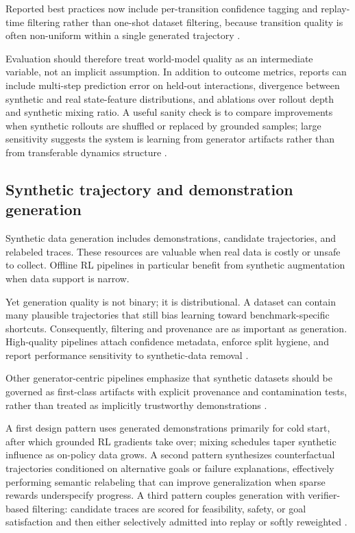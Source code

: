 ﻿\documentclass[conference]{IEEEtran}
\begin{document}
Reported best practices now include per-transition confidence tagging and replay-time filtering rather than one-shot dataset filtering, because transition quality is often non-uniform within a single generated trajectory \cite{arxiv_p_2602_00785,arxiv_p_2602_03022,arxiv_p_2602_12099}.

Evaluation should therefore treat world-model quality as an intermediate variable, not an implicit assumption. In addition to outcome metrics, reports can include multi-step prediction error on held-out interactions, divergence between synthetic and real state-feature distributions, and ablations over rollout depth and synthetic mixing ratio. A useful sanity check is to compare improvements when synthetic rollouts are shuffled or replaced by grounded samples; large sensitivity suggests the system is learning from generator artifacts rather than from transferable dynamics structure \cite{arxiv_p_2601_22149,arxiv_p_2602_02454,arxiv_p_2602_11075}.

\subsection{Synthetic trajectory and demonstration generation}
Synthetic data generation includes demonstrations, candidate trajectories, and relabeled traces. These resources are valuable when real data is costly or unsafe to collect. Offline RL pipelines in particular benefit from synthetic augmentation when data support is narrow.

Yet generation quality is not binary; it is distributional. A dataset can contain many plausible trajectories that still bias learning toward benchmark-specific shortcuts. Consequently, filtering and provenance are as important as generation. High-quality pipelines attach confidence metadata, enforce split hygiene, and report performance sensitivity to synthetic-data removal \cite{arxiv_p_2310_20587,arxiv_p_2505_18098,arxiv_p_2601_08107,arxiv_p_2602_14468}.

Other generator-centric pipelines emphasize that synthetic datasets should be governed as first-class artifacts with explicit provenance and contamination tests, rather than treated as implicitly trustworthy demonstrations \cite{arxiv_p_2601_03205}.

A first design pattern uses generated demonstrations primarily for cold start, after which grounded RL gradients take over; mixing schedules taper synthetic influence as on-policy data grows. A second pattern synthesizes counterfactual trajectories conditioned on alternative goals or failure explanations, effectively performing semantic relabeling that can improve generalization when sparse rewards underspecify progress. A third pattern couples generation with verifier-based filtering: candidate traces are scored for feasibility, safety, or goal satisfaction and then either selectively admitted into replay or softly reweighted \cite{arxiv_p_2310_20587,arxiv_p_2505_18098,arxiv_p_2601_08107,arxiv_p_2602_03305,arxiv_p_2602_02137}.
\end{document}
